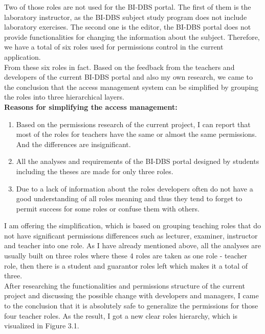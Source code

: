

\noindent Two of those roles are not used for the BI-DBS portal. The first of them is the laboratory instructor, as the BI-DBS subject study program does not include laboratory exercises. The second one is the editor, the BI-DBS portal does not provide functionalities for changing the information about the subject. Therefore, we have a total of six roles used for permissions control in the current application.\\  
From these six roles in fact. Based on the feedback from the teachers and developers of the current BI-DBS portal and also my own research, we came to the conclusion that the access management system can be simplified by grouping the roles into three hierarchical layers.\\

\noindent \textbf{Reasons for simplifying the access management:}

\begin{enumerate}
    \item Based on the permissions research of the current project, I can report that most of the roles for teachers have the same or almost the same permissions. And the differences are insignificant.
    \item All the analyses and requirements of the BI-DBS portal designed by students including the theses are made for only three roles.
    \item Due to a lack of information about the roles developers often do not have a good understanding of all roles meaning and thus they tend to forget to permit success for some roles or confuse them with others.
\end{enumerate}

\noindent I am offering the simplification, which is based on grouping teaching roles that do not have significant permissions differences such as lecturer, examiner, instructor and teacher into one role. As I have already mentioned above, all the analyses are usually built on three roles where these 4 roles are taken as one role - teacher role, then there is a student and guarantor roles left which makes it a total of three.\\
After researching the functionalities and permissions structure of the current project and discussing the possible change with developers and managers, I came to the conclusion that it is absolutely safe to generalize the permissions for those four teacher roles. As the result, I got a new clear roles hierarchy, which is visualized in Figure 3.1.


